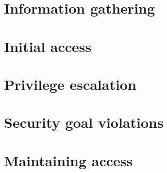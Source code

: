 \section{Information gathering}


\section{Initial access}


\section{Privilege escalation}


\section{Security goal violations}
  

\section{Maintaining access}
